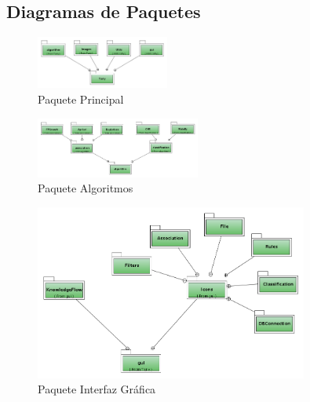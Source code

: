 \subsection{Diagramas de Paquetes}

\begin{figure}[h]
\centering
\includegraphics[angle=90, width=0.39\textwidth]{imgsPaquetes/tariy.png}
\caption{Paquete Principal}
\end{figure}
\newpage
\begin{figure}
\centering
\includegraphics[angle=90, width=0.48\textwidth]{imgsPaquetes/algorithm.png}
\caption{Paquete Algoritmos}
\end{figure}
\newpage
\begin{figure}
\centering
\includegraphics[angle=90, width=0.8\textwidth]{imgsPaquetes/gui.png}
\caption{Paquete Interfaz Gr\'afica}
\end{figure}
\newpage

